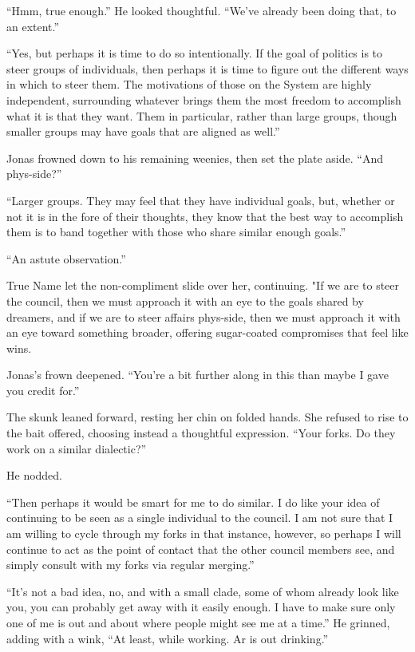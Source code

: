 ``Hmm, true enough.'' He looked thoughtful. ``We've already been doing that, to an extent.''

``Yes, but perhaps it is time to do so intentionally. If the goal of politics is to steer groups of individuals, then perhaps it is time to figure out the different ways in which to steer them. The motivations of those on the System are highly independent, surrounding whatever brings them the most freedom to accomplish what it is that they want. Them in particular, rather than large groups, though smaller groups may have goals that are aligned as well.''

Jonas frowned down to his remaining weenies, then set the plate aside. ``And phys-side?''

``Larger groups. They may feel that they have individual goals, but, whether or not it is in the fore of their thoughts, they know that the best way to accomplish them is to band together with those who share similar enough goals.''

``An astute observation.''

True Name let the non-compliment slide over her, continuing. "If we are to steer the council, then we must approach it with an eye to the goals shared by dreamers, and if we are to steer affairs phys-side, then we must approach it with an eye toward something broader, offering sugar-coated compromises that feel like wins.

Jonas's frown deepened. ``You're a bit further along in this than maybe I gave you credit for.''

The skunk leaned forward, resting her chin on folded hands. She refused to rise to the bait offered, choosing instead a thoughtful expression. ``Your forks. Do they work on a similar dialectic?''

He nodded.

``Then perhaps it would be smart for me to do similar. I do like your idea of continuing to be seen as a single individual to the council. I am not sure that I am willing to cycle through my forks in that instance, however, so perhaps I will continue to act as the point of contact that the other council members see, and simply consult with my forks via regular merging.''

``It's not a bad idea, no, and with a small clade, some of whom already look like you, you can probably get away with it easily enough. I have to make sure only one of me is out and about where people might see me at a time.'' He grinned, adding with a wink, ``At least, while working. Ar is out drinking.''

